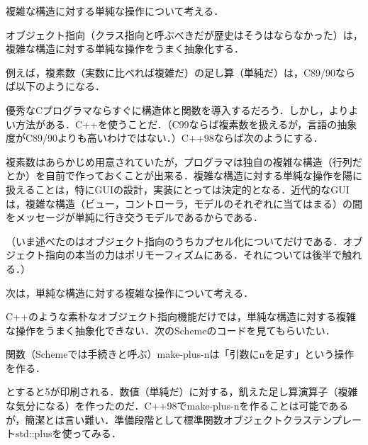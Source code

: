 \documentclass[a4paper,twocolumn]{jsbook}
\begin{document}
複雑な構造に対する単純な操作について考える．

オブジェクト指向（クラス指向と呼ぶべきだが歴史はそうはならなかった）は，複雑な構造に対する単純な操作をうまく抽象化する．

例えば，複素数（実数に比べれば複雑だ）の足し算（単純だ）は，C89/90ならば以下のようになる．


優秀なCプログラマならすぐに構造体と関数を導入するだろう．しかし，よりよい方法がある．C++を使うことだ．（C99ならば複素数を扱えるが，言語の抽象度がC89/90よりも高いわけではない．）C++98ならば次のようにする．


複素数はあらかじめ用意されていたが，プログラマは独自の複雑な構造（行列だとか）を自前で作っておくことが出来る．複雑な構造に対する単純な操作を陽に扱えることは，特にGUIの設計，実装にとっては決定的となる．近代的なGUIは，複雑な構造（ビュー，コントローラ，モデルのそれぞれに当てはまる）の間をメッセージが単純に行き交うモデルであるからである．

（いま述べたのはオブジェクト指向のうちカプセル化についてだけである．オブジェクト指向の本当の力はポリモーフィズムにある．それについては後半で触れる．）

次は，単純な構造に対する複雑な操作について考える．

C++のような素朴なオブジェクト指向機能だけでは，単純な構造に対する複雑な操作をうまく抽象化できない．次のSchemeのコードを見てもらいたい．


関数（Schemeでは手続きと呼ぶ）make-plus-nは「引数にnを足す」という操作を作る．


とすると5が印刷される．数値（単純だ）に対する，飢えた足し算演算子（複雑な気分になる）を作ったのだ．C++98でmake-plus-nを作ることは可能であるが，簡潔とは言い難い．準備段階として標準関数オブジェクトクラステンプレートstd::plusを使ってみる．
\end{document}
